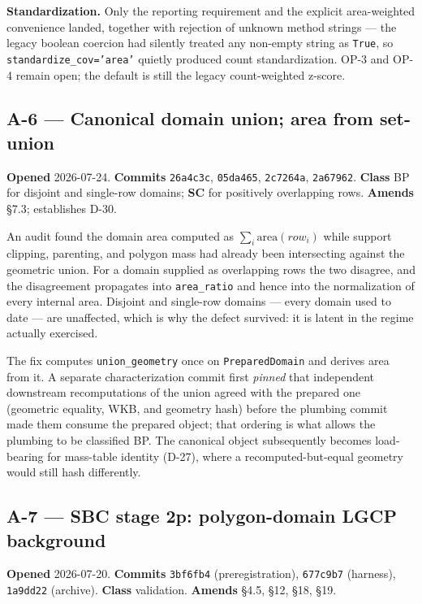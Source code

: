 \documentclass[
  10pt,
]{article}
\begin{document}
\textbf{Standardization.} Only the reporting requirement and the explicit area-weighted convenience landed, together with rejection of unknown method strings --- the legacy boolean coercion had silently treated any non-empty string as \texttt{True}, so \texttt{standardize\_cov='area'} quietly produced count standardization. OP-3 and OP-4 remain open; the default is still the legacy count-weighted z-score.

\hypertarget{a-6}{%
\subsection{A-6 --- Canonical domain union; area from set-union}\label{a-6}}

\textbf{Opened} 2026-07-24. \textbf{Commits} \texttt{26a4c3c}, \texttt{05da465}, \texttt{2c7264a}, \texttt{2a67962}. \textbf{Class} BP for disjoint and single-row domains; \textbf{SC} for positively overlapping rows. \textbf{Amends} §7.3; establishes D-30.

An audit found the domain area computed as \(\sum_i \mathrm{area}(row_i)\) while support clipping, parenting, and polygon mass had already been intersecting against the geometric union. For a domain supplied as overlapping rows the two disagree, and the disagreement propagates into \texttt{area\_ratio} and hence into the normalization of every internal area. Disjoint and single-row domains --- every domain used to date --- are unaffected, which is why the defect survived: it is latent in the regime actually exercised.

The fix computes \texttt{union\_geometry} once on \texttt{PreparedDomain} and derives area from it. A separate characterization commit first \emph{pinned} that independent downstream recomputations of the union agreed with the prepared one (geometric equality, WKB, and geometry hash) before the plumbing commit made them consume the prepared object; that ordering is what allows the plumbing to be classified BP. The canonical object subsequently becomes load-bearing for mass-table identity (D-27), where a recomputed-but-equal geometry would still hash differently.

\hypertarget{a-7}{%
\subsection{A-7 --- SBC stage 2p: polygon-domain LGCP background}\label{a-7}}

\textbf{Opened} 2026-07-20. \textbf{Commits} \texttt{3bf6fb4} (preregistration), \texttt{677c9b7} (harness), \texttt{1a9dd22} (archive). \textbf{Class} validation. \textbf{Amends} §4.5, §12, §18, §19.
\end{document}
